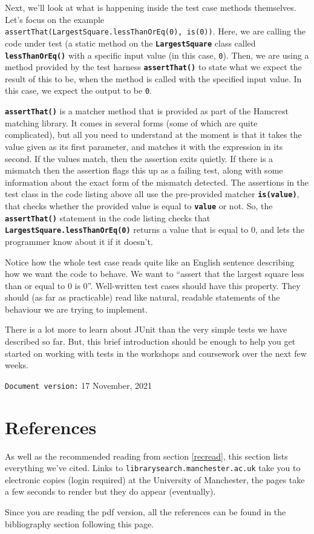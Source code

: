 \documentclass[
]{book}
\begin{document}
Next, we'll look at what is happening inside the test case methods themselves. Let's focus on the example \texttt{assertThat(LargestSquare.lessThanOrEq(0),\ is(0))}. Here, we are calling the code under test (a static method on the \textbf{\texttt{LargestSquare}} class called \textbf{\texttt{lessThanOrEq()}} with a specific input value (in this case, \texttt{0}). Then, we are using a method provided by the test harness \textbf{\texttt{assertThat()}} to state what we expect the result of this to be, when the method is called with the specified input value. In this case, we expect the output to be \texttt{0}.

\textbf{\texttt{assertThat()}} is a matcher method that is provided as part of the Hamcrest matching library. It comes in several forms (some of which are quite complicated), but all you need to understand at the moment is that it takes the value given as its first parameter, and matches it with the expression in its second. If the values match, then the assertion exits quietly. If there is a mismatch then the assertion flags this up as a failing test, along with some information about the exact form of the mismatch detected. The assertions in the test class in the code listing above all use the pre-provided matcher \textbf{\texttt{is(value)}}, that checks whether the provided value is equal to \textbf{\texttt{value}} or not. So, the \textbf{\texttt{assertThat()}} statement in the code listing checks that \textbf{\texttt{LargestSquare.lessThanOrEq(0)}} returns a value that is equal to 0, and lets the programmer know about it if it doesn't.

Notice how the whole test case reads quite like an English sentence describing how we want the code to behave. We want to ``assert that the largest square less than or equal to 0 is 0''. Well-written test cases should have this property. They should (as far as practicable) read like natural, readable statements of the behaviour we are trying to implement.

There is a lot more to learn about JUnit than the very simple tests we have described so far. But, this brief introduction should be enough to help you get started on working with tests in the workshops and coursework over the next few weeks.

\texttt{Document\ version:} 17 November, 2021

\hypertarget{reading}{%
\chapter{References}\label{reading}}

As well as the recommended reading from section \ref{recread}, this section lists everything we've cited. Links to \texttt{librarysearch.manchester.ac.uk} take you to electronic copies (login required) at the University of Manchester, the pages take a few seconds to render but they do appear (eventually).

Since you are reading the pdf version, all the references can be found in the bibliography section following this page.

  
\end{document}
